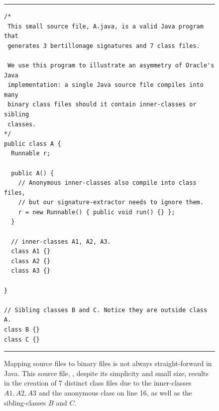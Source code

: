 \begin{figure}
  \centering
  \begin{minipage}[h]{0.88\linewidth}
\hrule
{}
\begin{lstlisting}
/*
 This small source file, A.java, is a valid Java program that
 generates 3 bertillonage signatures and 7 class files.

 We use this program to illustrate an asymmetry of Oracle's Java
 implementation: a single Java source file compiles into many
 binary class files should it contain inner-classes or sibling
 classes.
*/
public class A {
  Runnable r;

  public A() {
    // Anonymous inner-classes also compile into class files,
    // but our signature-extractor needs to ignore them.
    r = new Runnable() { public void run() {} };
  }

  // inner-classes A1, A2, A3.
  class A1 {}
  class A2 {}
  class A3 {}

}

// Sibling classes B and C. Notice they are outside class A.
class B {}
class C {}
\end{lstlisting}
\hrule\vspace{1mm}
\end{minipage}
  \caption{\small{Mapping source files to binary files is not always
straight-forward in Java.  This source file, ,
despite its simplicity and small size, results in the
creation of 7 distinct class files due to
the inner-classes $A1, A2, A3$ and the anonymous class on line 16,
as well as the sibling-classes $B$ and $C$.
\vspace{-1em}}}
\label{lst:asym}
\end{figure}

\vspace{-0.5em}

